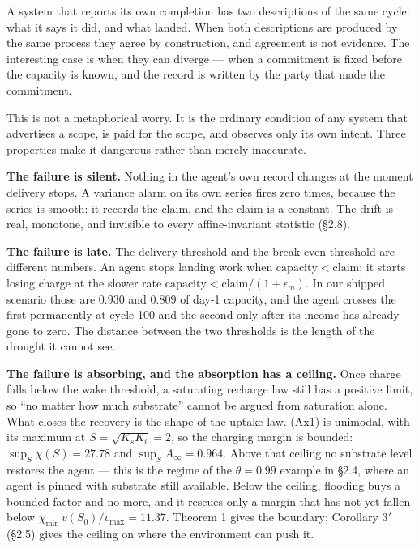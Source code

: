 \documentclass[11pt,a4paper]{article}
\begin{document}
A system that reports its own completion has two descriptions of the same
cycle: what it says it did, and what landed. When both descriptions are produced
by the same process they agree by construction, and agreement is not evidence.
The interesting case is when they can diverge --- when a commitment is fixed
before the capacity is known, and the record is written by the party that made
the commitment.

This is not a metaphorical worry. It is the ordinary condition of any system
that advertises a scope, is paid for the scope, and observes only its own
intent. Three properties make it dangerous rather than merely inaccurate.

\textbf{The failure is silent.} Nothing in the agent's own record changes at the
moment delivery stops. A variance alarm on its own series fires zero times,
because the series is smooth: it records the claim, and the claim is a constant.
The drift is real, monotone, and invisible to every affine-invariant statistic
(§2.8).

\textbf{The failure is late.} The delivery threshold and the break-even threshold are
different numbers. An agent stops landing work when
\(\mathrm{capacity}<\mathrm{claim}\); it starts losing charge at the slower rate
\(\mathrm{capacity}<\mathrm{claim}/(1+\epsilon_m)\). In our shipped scenario those
are \(0.930\) and \(0.809\) of day-1 capacity, and the agent crosses the first
permanently at cycle 100 and the second only after its income has already gone to
zero. The distance between the two thresholds is the length of the drought it
cannot see.

\textbf{The failure is absorbing, and the absorption has a ceiling.} Once charge falls
below the wake threshold, a saturating recharge law still has a positive limit, so
``no matter how much substrate'' cannot be argued from saturation alone. What closes
the recovery is the shape of the uptake law. (Ax1) is unimodal, with its maximum at
\(S=\sqrt{K_sK_i}=2\), so the charging margin is bounded: \(\sup_S\chi(S)=27.78\) and
\(\sup_S A_\infty=0.964\). Above that ceiling no substrate level restores the agent ---
this is the regime of the \(\theta=0.99\) example in §2.4, where an agent is pinned
with substrate still available. Below the ceiling, flooding buys a bounded factor
and no more, and it rescues only a margin that has not yet fallen below
\(\chi_{\min}\,v(S_0)/v_{\max}=11.37\). Theorem 1 gives the boundary; Corollary 3\('\)
(§2.5) gives the ceiling on where the environment can push it.
\end{document}
